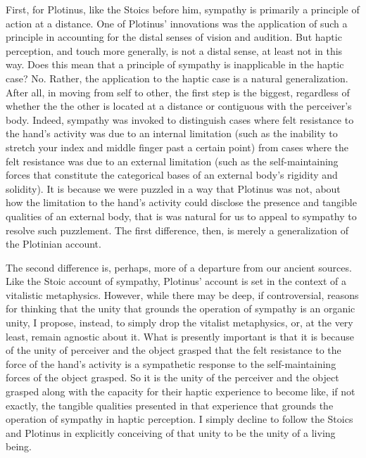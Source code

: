 First, for Plotinus, like the Stoics before him, sympathy is primarily a principle of action at a distance. One of Plotinus' innovations was the application of such a principle in accounting for the distal senses of vision and audition. But haptic perception, and touch more generally, is not a distal sense, at least not in this way. Does this mean that a principle of sympathy is inapplicable in the haptic case? No. Rather, the application to the haptic case is a natural generalization. After all, in moving from self to other, the first step is the biggest, regardless of whether the the other is located at a distance or contiguous with the perceiver's body. Indeed, sympathy was invoked to distinguish cases where felt resistance to the hand's activity was due to an internal limitation (such as the inability to stretch your index and middle finger past a certain point) from cases where the felt resistance was due to an external limitation (such as the self-maintaining forces that constitute the categorical bases of an external body's rigidity and solidity). It is because we were puzzled in a way that Plotinus was not, about how the limitation to the hand's activity could disclose the presence and tangible qualities of an external body, that is was natural for us to appeal to sympathy to resolve such puzzlement. The first difference, then, is merely a generalization of the Plotinian account.

The second difference is, perhaps, more of a departure from our ancient sources. Like the Stoic account of sympathy, Plotinus' account is set in the context of a vitalistic metaphysics. However, while there may be deep, if controversial, reasons for thinking that the unity that grounds the operation of sympathy is an organic unity, I propose, instead, to simply drop the vitalist metaphysics, or, at the very least, remain agnostic about it. What is presently important is that it is because of the unity of perceiver and the object grasped that the felt resistance to the force of the hand's activity is a sympathetic response to the self-maintaining forces of the object grasped. So it is the unity of the perceiver and the object grasped along with the capacity for their haptic experience to become like, if not exactly, the tangible qualities presented in that experience that grounds the operation of sympathy in haptic perception. I simply decline to follow the Stoics and Plotinus in explicitly conceiving of that unity to be the unity of a living being.

